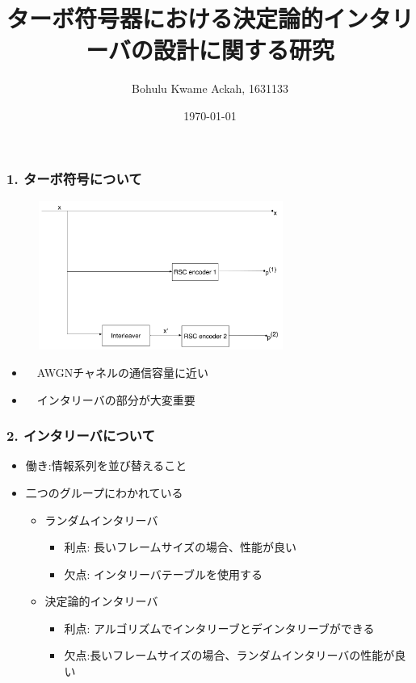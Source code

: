 \documentclass{beamer}  %
\title[ターボ符号器における決定論的インタリーバの設計に関する研究]{ターボ符号器における決定論的インタリーバの設計に関する研究}
\author[Bohulu]{Bohulu Kwame Ackah, 1631133}
\institute[UEC]{情報伝送研究室}
\date[Week 3]{\today}
\begin{document}
\frame{\titlepage}


\begin{frame}

	\frametitle{1. ターボ符号について}
	\begin{figure}
		\includegraphics[width=8cm]{TurboEncoder.pdf}
	\end{figure}
	
	\begin{itemize}
	\item　AWGNチャネルの通信容量に近い
	\item　インタリーバの部分が大変重要
	\end{itemize}
	
\end{frame}


\begin{frame}
\frametitle{2. インタリーバについて}

\begin{itemize}
\setlength\itemsep{2em}
\item 働き:情報系列を並び替えること

\item 二つのグループにわかれている
\begin{itemize}
\setlength\itemsep{1em}
\item ランダムインタリーバ
\begin{itemize}
\item 利点: 長いフレームサイズの場合、性能が良い

\item 欠点: インタリーバテーブルを使用する
\end{itemize}
\item 決定論的インタリーバ
\begin{itemize}
\item 利点: アルゴリズムでインタリーブとデインタリーブができる

\item 欠点:長いフレームサイズの場合、ランダムインタリーバの性能が良い
\end{itemize}
\end{itemize}

\end{itemize}

\end{frame}
\end{document}
